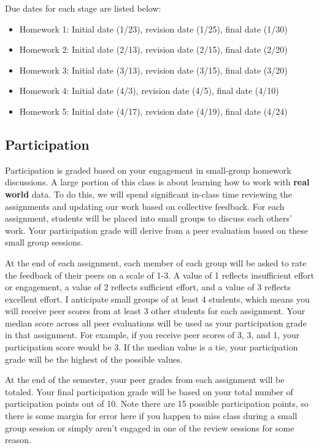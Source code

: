 \documentclass[11pt,]{article}
\providecommand{\tightlist}{%
  \setlength{\itemsep}{0pt}\setlength{\parskip}{0pt}}
\begin{document}
Due dates for each stage are listed below:

\begin{itemize}
\tightlist
\item
  Homework 1: Initial date (1/23), revision date (1/25), final date
  (1/30)
\item
  Homework 2: Initial date (2/13), revision date (2/15), final date
  (2/20)
\item
  Homework 3: Initial date (3/13), revision date (3/15), final date
  (3/20)
\item
  Homework 4: Initial date (4/3), revision date (4/5), final date (4/10)
\item
  Homework 5: Initial date (4/17), revision date (4/19), final date
  (4/24)
\end{itemize}

\hypertarget{participation}{%
\subsection{Participation}\label{participation}}

Participation is graded based on your engagement in small-group homework
discussions. A large portion of this class is about learning how to work
with \textbf{real world} data. To do this, we will spend significant
in-class time reviewing the assignments and updating our work based on
collective feedback. For each assignment, students will be placed into
small groups to discuss each others' work. Your participation grade will
derive from a peer evaluation based on these small group sessions.

At the end of each assignment, each member of each group will be asked
to rate the feedback of their peers on a scale of 1-3. A value of 1
reflects insufficient effort or engagement, a value of 2 reflects
sufficient effort, and a value of 3 reflects excellent effort. I
anticipate small groups of at least 4 students, which means you will
receive peer scores from at least 3 other students for each assignment.
Your median score across all peer evaluations will be used as your
participation grade in that assignment. For example, if you receive peer
scores of 3, 3, and 1, your participation score would be 3. If the
median value is a tie, your participation grade will be the highest of
the possible values.

At the end of the semester, your peer grades from each assignment will
be totaled. Your final participation grade will be based on your total
number of participation points out of 10. Note there are 15 possible
participation points, so there is some margin for error here if you
happen to miss class during a small group session or simply aren't
engaged in one of the review sessions for some reason.
\end{document}
